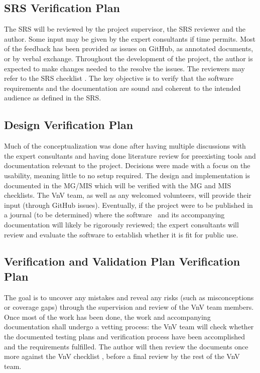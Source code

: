 \documentclass[12pt, titlepage]{article}
\begin{document}
\subsection{SRS Verification Plan} \label{sec_srs_vplan}

The SRS will be reviewed by the project supervisor, the SRS reviewer and the author. Some input
may be given by the expert consultants if time permits. Most of the feedback has been provided 
as issues on GitHub, as annotated documents, or by verbal exchange. 
Throughout the development of the project, the author is expected 
to make changes needed to the resolve the issues. The reviewers may refer to the SRS checklist \citep{SRS_checklist}.
The key objective is to verify that the software requirements and the documentation are sound 
and coherent to the intended audience as defined in the SRS.


\subsection{Design Verification Plan} \label{sec_design_vplan}

Much of the conceptualization was done after having multiple discussions with the expert 
consultants and having done literature review for preexisting tools and documentation 
relevant to the project. Decisions were made with a focus on the usability, meaning little to 
no setup required. The design and implementation is documented in the 
MG\citep{MG}/MIS\citep{MIS} which will be verified with the MG \cite{MG_checklist}
and MIS \cite{MIS_checklist} checklists.
The VnV team, as well as any welcomed volunteers, will provide
their input (through GitHub issues). Eventually, if the project were to be published
in a journal (to be determined) where the software \progname~and its
accompanying documentation will likely be rigorously reviewed; the expert
consultants will review and evaluate the software to
establish whether it is fit for public use.


\subsection{Verification and Validation Plan Verification Plan}

The goal is to uncover any mistakes and reveal any risks (such as misconceptions or coverage gaps) 
through the supervision and 
review of the VnV team members. Once most of the work has been done, the work and
accompanying documentation shall undergo a vetting process: the VnV team
will check whether the documented testing plans and verification process have been 
accomplished and the requirements fulfilled. The author will then review the documents once more
against the VnV checklist \citep{VnV_checklist}, before a final review by the rest of the VnV team.
\end{document}

